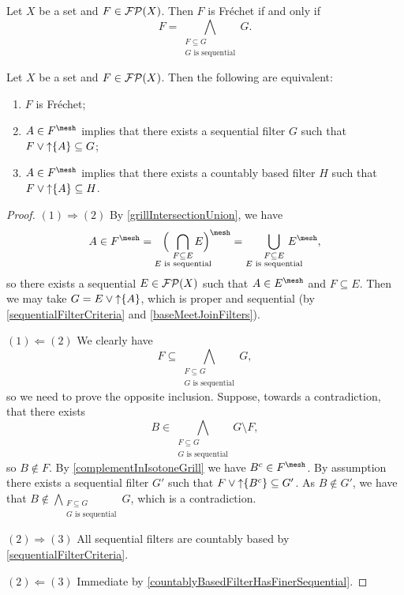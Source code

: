 \begin{lemma}
Let $X$ be a set and $F\in\operatorname{\mathcal{FP}}(X)$. Then $F$ is Fréchet \textup{if and only if}
\[ F = \bigwedge_{\substack{F\subseteq G \\ \text{$G$ is sequential}}} G. \]
\end{lemma}

\begin{proposition}
Let $X$ be a set and $F\in\operatorname{\mathcal{FP}}(X)$. Then the following are equivalent:
\begin{enumerate}
\item $F$ is Fréchet;
\item $A\in F^\mesh$ implies that there exists a sequential filter $G$ such that $F\vee \operatorname{\uparrow}\{A\} \subseteq G$;
\item $A\in F^\mesh$ implies that there exists a countably based filter $H$ such that $F\vee \operatorname{\uparrow}\{A\} \subseteq H$.
\end{enumerate}
\end{proposition}
\begin{proof}
$(1) \Rightarrow (2)$ By \ref{grillIntersectionUnion}, we have
\[ A\in F^\mesh = \hspace{0.7em} \Big( \hspace{-1.5em} \bigcap_{\substack{F\subseteq E \\ \text{$E$ is sequential}}} \hspace{-1.7em} E\Big)^\mesh = \bigcup_{\substack{F\subseteq E \\ \text{$E$ is sequential}}} \hspace{-1.5em} E^\mesh, \]
so there exists a sequential $E\in\operatorname{\mathcal{FP}}(X)$ such that $A\in E^\mesh$ and $F\subseteq E$. Then we may take $G = E\vee \operatorname{\uparrow}\{A\}$, which is proper and sequential (by \ref{sequentialFilterCriteria} and \ref{baseMeetJoinFilters}).

$(1) \Leftarrow (2)$ We clearly have
\[ F \subseteq \bigwedge_{\substack{F\subseteq G \\ \text{$G$ is sequential}}}G, \]
so we need to prove the opposite inclusion. Suppose, towards a contradiction, that there exists
\[ B \in \bigwedge_{\substack{F\subseteq G \\ \text{$G$ is sequential}}} G \setminus F, \]
so $B\notin F$. By \ref{complementInIsotoneGrill} we have $B^c\in F^\mesh$. By assumption there exists a sequential filter $G'$ such that $F\vee \operatorname{\uparrow}\{B^c\} \subseteq G'$. As $B\notin G'$, we have that $B\notin \bigwedge_{\substack{F\subseteq G \\ \text{$G$ is sequential}}} G$, which is a contradiction.

$(2) \Rightarrow (3)$ All sequential filters are countably based by \ref{sequentialFilterCriteria}.

$(2) \Leftarrow (3)$ Immediate by \ref{countablyBasedFilterHasFinerSequential}.
\end{proof}
